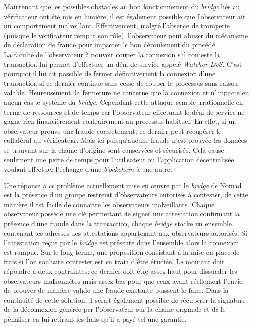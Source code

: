 Maintenant que les possibles obstacles au bon fonctionnement du \textit{bridge} liés au vérificateur ont été mis en lumière, il est également possible que l’observateur ait un comportement malveillant.  Effectivement, malgré l’absence de tromperie (puisque le vérificateur remplit son rôle), l’observateur peut abuser du mécanisme de déclaration de fraude pour impacter le bon déroulement du procédé. \\

La faculté de l’observateur à pouvoir couper la connexion s’il conteste la transaction lui permet d’effectuer un déni de service appelé \textit{Watcher DoS}. C’est pourquoi il lui ait possible de fermer définitivement la connexion d’une transaction si ce dernier continue sans cesse de couper le processus sans raison valable. Heureusement, la fermeture ne concerne que la connexion et n’impacte en aucun cas le système du \textit{bridge}. Cependant cette attaque semble irrationnelle en terme de ressources et de temps car l’observateur effectuant le déni de service ne gagne rien financièrement contrairement au processus habituel. En effet, si un observateur prouve une fraude correctement, ce dernier peut récupérer le collatéral du vérificateur. Mais ici puisqu’aucune fraude n’est prouvée les données se trouvant sur la chaîne d’origine sont conservées et sécurisés. Cela cause seulement une perte de temps pour l’utilisateur ou l’application décentralisée voulant effectuer l'échange d’une \textit{blockchain} à une autre.

Une réponse à ce problème actuellement mise en œuvre par le \textit{bridge} de Nomad est la présence d’un groupe restreint d’observateurs autorisés à contester, de cette manière il est facile de connaître les observateurs malveillants. Chaque observateur possède une clé permettant de signer une attestation confirmant la présence d’une fraude dans la transaction, chaque \textit{bridge} stocke un ensemble contenant les adresses des attestations appartenant aux observateurs autorisés. Si l’attestation reçue par le \textit{bridge} est présente dans l’ensemble alors la connexion est rompue\cite{NomadDocsWatcher}.
Sur le long terme, une proposition consistant à la mise en place de frais si l’on souhaite contester est en train d’être étudiée. Le montant doit répondre à deux contraintes: ce dernier doit être assez haut pour dissuader les observateurs malhonnêtes mais assez bas pour que ceux ayant réellement l’envie de prouver de manière valide une fraude existante puissent le faire. Dans la continuité de cette solution, il serait également possible de récupérer la signature de la déconnexion générée par l’observateur sur la chaîne originale et de le pénaliser en lui retirant les frais qu’il a payé tel une garantie\cite{OptimisticBhuptani}.

